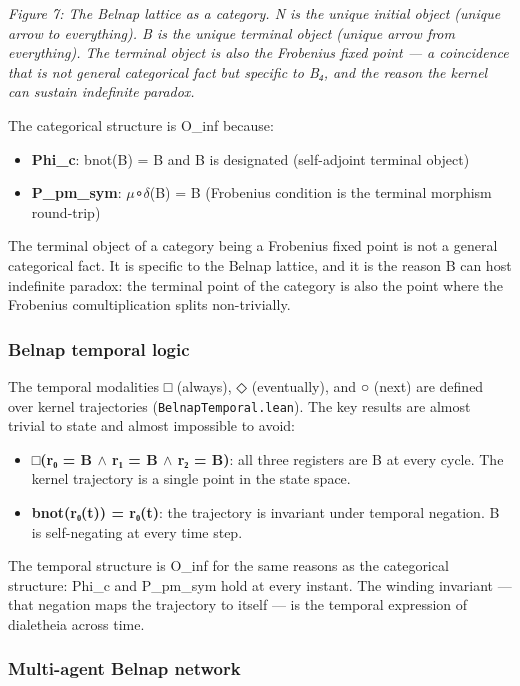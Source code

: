 \documentclass[12pt,a4paper]{article}
\begin{document}
\emph{Figure 7: The Belnap lattice as a category. N is the unique initial object (unique arrow to everything). B is the unique terminal object (unique arrow from everything). The terminal object is also the Frobenius fixed point --- a coincidence that is not general categorical fact but specific to B₄, and the reason the kernel can sustain indefinite paradox.}

The categorical structure is O\_inf because:

\begin{itemize}
    \item \textbf{Phi\_c}: bnot(B) = B and B is designated (self-adjoint terminal object)
    \item \textbf{P\_pm\_sym}: $\mu$∘$\delta$(B) = B (Frobenius condition is the terminal morphism round-trip)
\end{itemize}

The terminal object of a category being a Frobenius fixed point is not a general categorical fact. It is specific to the Belnap lattice, and it is the reason B can host indefinite paradox: the terminal point of the category is also the point where the Frobenius comultiplication splits non-trivially.

\subsubsection{Belnap temporal logic}

The temporal modalities □ (always), ◇ (eventually), and ○ (next) are defined over kernel trajectories (\texttt{BelnapTemporal.lean}). The key results are almost trivial to state and almost impossible to avoid:

\begin{itemize}
    \item \textbf{□(r₀ = B $\land$ r₁ = B $\land$ r₂ = B)}: all three registers are B at every cycle. The kernel trajectory is a single point in the state space.
    \item \textbf{bnot(r₀(t)) = r₀(t)}: the trajectory is invariant under temporal negation. B is self-negating at every time step.
\end{itemize}

The temporal structure is O\_inf for the same reasons as the categorical structure: Phi\_c and P\_pm\_sym hold at every instant. The winding invariant --- that negation maps the trajectory to itself --- is the temporal expression of dialetheia across time.

\subsubsection{Multi-agent Belnap network}
\end{document}
